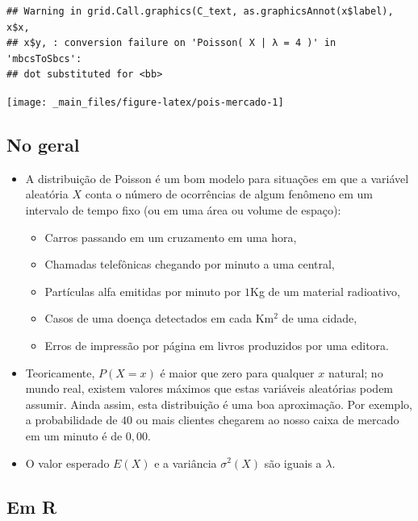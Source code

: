 \documentclass[
  11pt]{report}
\begin{document}
\begin{verbatim}
## Warning in grid.Call.graphics(C_text, as.graphicsAnnot(x$label), x$x,
## x$y, : conversion failure on 'Poisson( X | λ = 4 )' in 'mbcsToSbcs':
## dot substituted for <bb>
\end{verbatim}

\begin{center}\texttt{[image: \_main\_files/figure-latex/pois-mercado-1]} \end{center}

\hypertarget{no-geral-5}{%
\subsection{No geral}\label{no-geral-5}}

\begin{itemize}
\item
  A distribuição de Poisson é um bom modelo para situações em que a variável aleatória $X$ conta o número de ocorrências de algum fenômeno em um intervalo de tempo fixo (ou em uma área ou volume de espaço):

  \begin{itemize}
  \item
    Carros passando em um cruzamento em uma hora,
  \item
    Chamadas telefônicas chegando por minuto a uma central,
  \item
    Partículas alfa emitidas por minuto por $1$Kg de um material radioativo,
  \item
    Casos de uma doença detectados em cada Km$^2$ de uma cidade,
  \item
    Erros de impressão por página em livros produzidos por uma editora.
  \end{itemize}
\item
  Teoricamente, $P(X=x)$ é maior que zero para qualquer $x$ natural; no mundo real, existem valores máximos que estas variáveis aleatórias podem assumir. Ainda assim, esta distribuição é uma boa aproximação. Por exemplo, a probabilidade de $40$ ou mais clientes chegarem ao nosso caixa de mercado em um minuto é de $0{,}00$.
\item
  O valor esperado $E(X)$ e a variância $\sigma^2(X)$ são iguais a $\lambda$.
\end{itemize}

\hypertarget{em-r-4}{%
\subsection{Em R}\label{em-r-4}}
\end{document}
